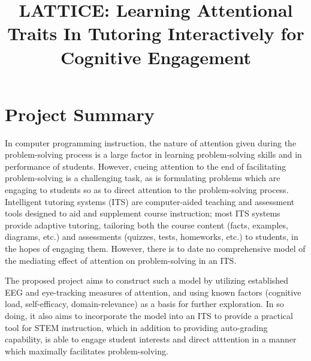 \documentclass[hidelinks,11pt]{article}
\begin{document}
\title{LATTICE: Learning Attentional Traits In Tutoring Interactively for Cognitive Engagement}
\maketitle
\thispagestyle{empty}
\pagestyle{empty}

\tableofcontents
\pagebreak


\section{Project Summary}

\vspace{-6pt}
In computer programming instruction, the nature of attention given during the
problem-solving process is a large factor in learning problem-solving skills
and in performance of students. However, cueing attention to the end of
facilitating problem-solving is a challenging task, as is formulating problems
which are engaging to students so as to direct attention to the problem-solving
process.  Intelligent tutoring systems (ITS) are computer-aided teaching and
assessment tools designed to aid and supplement course instruction; most ITS
systems provide adaptive tutoring, tailoring both the course content (facts,
examples, diagrams, etc.) and assessments (quizzes, tests, homeworks, etc.) to
students, in the hopes of engaging them.  However, there is to date no
comprehensive model of the mediating effect of attention on problem-solving in
an ITS. 

The proposed project aims to construct such a model by utilizing established
EEG and eye-tracking measures of attention, and using known factors (cognitive
load, self-efficacy, domain-relevance) as a basis for further exploration. In
so doing, it also aims to incorporate the model into an ITS to provide a
practical tool for STEM instruction, which in addition to providing
auto-grading capability, is able to engage student interests and direct
atttention in a manner which maximally facilitates problem-solving.
\end{document}
